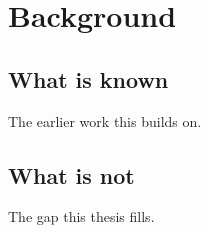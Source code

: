 \chapter{Background}
\label{ch:background}

\section{What is known}
\label{sec:known}

The earlier work this builds on.

\section{What is not}
\label{sec:gap}

The gap this thesis fills.
